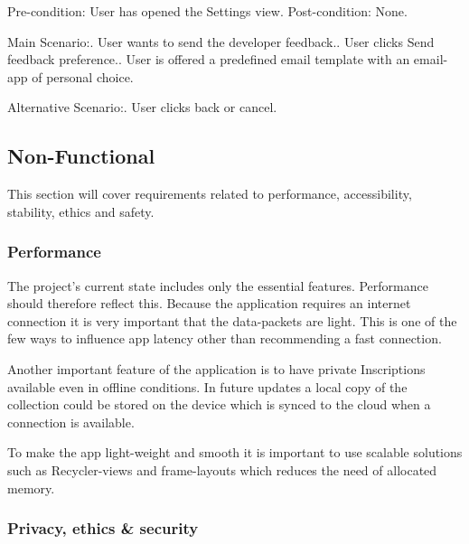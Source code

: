 \documentclass[]{article}
\begin{document}
\begin{flushleft}
{{		Pre-condition: User has opened the Settings view.\newline
		Post-condition: None.\newline
		
		Main Scenario:. User wants to send the developer feedback.. User clicks Send feedback preference.. User is offered a predefined email template with an email-app of personal choice.\newline
		
		Alternative Scenario:. User clicks back or cancel.\newline
		
		
	}
}\medskip


\subsection{Non-Functional}

This section will cover requirements related to performance, accessibility, stability, ethics and safety.\newline

\subsubsection{Performance}

The project's current state includes only the essential features. Performance should therefore reflect this. Because the application requires an internet connection it is very important that the data-packets are light. This is one of the few ways to influence app latency other than recommending a fast connection.\medskip

Another important feature of the application is to have private Inscriptions available even in offline conditions. In future updates a local copy of the collection could be stored on the device which is synced to the cloud when a connection is available.\medskip

To make the app light-weight and smooth it is important to use scalable solutions such as Recycler-views and frame-layouts which reduces the need of allocated memory.

\subsubsection{Privacy, ethics \& security}


\end{flushleft}
\end{document}
